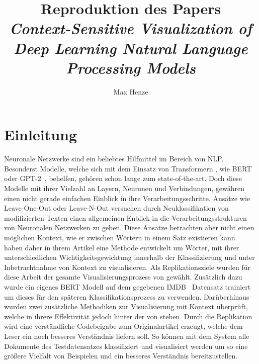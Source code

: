 \documentclass[DIV=13,fontsize=11pt]{scrartcl}
\begin{document}
\subject{Projektbericht zum Modul Data Mining Wintersemester 20221/2022}
\title{Reproduktion des Papers \\ \textit{Context-Sensitive Visualization of Deep Learning Natural Language Processing Models}\cite{dunn2021context}}
\author{Max Henze}%
\maketitle%

\section{Einleitung}

Neuronale Netzwerke sind ein beliebtes Hilfmittel im Bereich von NLP.
Besonderst Modelle, welche sich mit dem Einsatz von Transformern ,
wie BERT~\cite{devlin2018bert} oder GPT-2~\cite{radford2019language}, behelfen,
gehören schon lange zum state-of-the-art. Doch diese Modelle mit ihrer
Vielzahl an Layern, Neuronen und Verbindungen, gewähren einen nicht
gerade einfachen Einblick in ihre Verarbeitungsschritte. Ansätze wie Leave-One-Out
oder Leave-N-Out versuchen durch Neuklassifikation von modifizierten Texten einen
allgemeinen Enblick in die Verarbeitungsstrukturen von Neuronalen Netzwerken zu geben.
Diese Ansätze betrachten aber nicht einen möglichen Kontext, wie er zwischen
Wörtern in einem Satz existieren kann.
\citeauthor{dunn2021context} haben daher in ihrem Artikel 
eine Methode entwickelt um Wörter, mit ihrer unterschiedlichen Wichtigkeitsgewichtung
innerhalb der Klassifizierung und unter Inbetrachtnahme von Kontext zu visualisieren.
Als Replikationsziele wurden für diese Arbeit der gesamte Visualisierungsprozess
von \citeauthor{dunn2021context} gewählt. Zusätzlich dazu wurde ein eigenes
BERT Modell auf dem gegebenen IMDB~\cite{maas-EtAl:2011:ACL-HLT2011} Datensatz trainiert um
dieses für den späteren Klassifikationsprozess zu verwenden. Darüberhinaus
wurden zwei zusätzliche Methodiken zur Visualisierung mit Kontext überprüft,
welche in ihrere Effektivität jedoch hinter der von \citeauthor{dunn2021context}
stehen.
Durch die Replikation wird eine verständliche Codebeigabe zum Originalartikel
erzeugt, welche dem Leser ein noch besseres Verständnis liefern soll. So können
mit dem System alle Dokumente des Testdatensatzes klassifiziert und visualisiert werden
um so eine größere Vielfalt von Beispielen und ein besseres Verständnis bereitzustellen.
\end{document}

